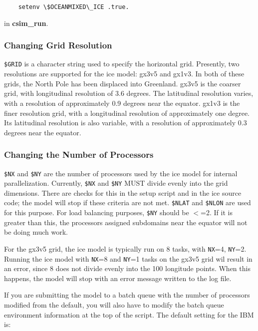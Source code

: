   \begin{verbatim}
    setenv \$OCEANMIXED\_ICE .true.
  \end{verbatim}
{\noindent in {\bf csim\_run}.}

\subsubsection{Changing Grid Resolution}

{\tt \$GRID} is a character string used to specify the horizontal grid.
Presently, two resolutions are supported for the ice model: gx3v5 and
gx1v3. In both of these grids, the North Pole has been displaced into 
Greenland.  gx3v5 is the coarser grid, with longitudinal resolution of
3.6 degrees. The latitudinal resolution varies, with a resolution of 
approximately 0.9 degrees near the equator. gx1v3 is the finer
resolution grid, with a longitudinal resolution of approximately one
degree. Its latitudinal resolution is also variable, with a resolution
of approximately 0.3 degrees near the equator. 

\subsubsection{Changing the Number of Processors}

{\tt \$NX} and {\tt \$NY} are the number of processors used by the
ice model for internal parallelization.
Currently, {\tt \$NX} and {\tt \$NY} MUST divide evenly into the grid dimensions.
There are checks for this in the setup script and in the ice source
code; the model will stop if these criteria are not met. {\tt \$NLAT} and
{\tt \$NLON} are used for this purpose.  For load balancing purposes, {\tt \$NY}
should be $<$=2.  If it is greater than this, the processors assigned
subdomains near the equator will not be doing much work.

For the gx3v5 grid, the ice model is typically run on 8 tasks, with {\tt NX}=4,
{\tt NY}=2. Running the ice model with {\tt NX}=8 and {\tt NY}=1 tasks on the
gx3v5 grid wil result in an error, since 8 does not divide evenly into the 100
longitude points.  When this happens, the model will stop with an error message
written to the log file.

If you are submitting the model to a batch queue with the number of processors
modified from the default, you will also have to modify the batch queue
environment information at the top of the script.  The default setting for the IBM is:

